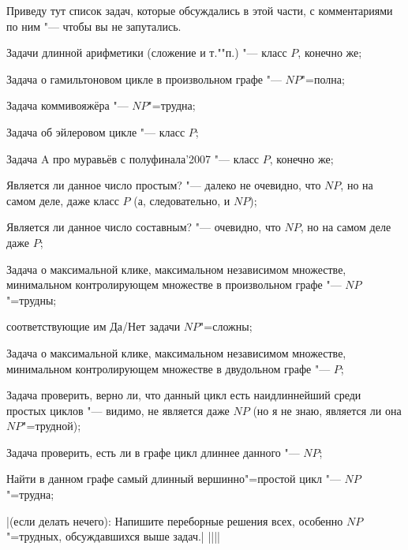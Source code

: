 \documentclass[a4paper,10pt]{problems}
\begin{document}
 Приведу тут список задач, которые обсуждались в этой 
части, с комментариями по ним "--- чтобы вы не запутались.
\begin{ulist}
\item Задачи длинной арифметики (сложение и т.""п.) "--- класс $P$, конечно же;
\item Задача о гамильтоновом цикле в произвольном графе "--- $NP$"=полна;
\item Задача коммивояжёра "--- $NP$"=трудна;
\item Задача об эйлеровом цикле "--- класс $P$;
\item Задача A про муравьёв с полуфинала'2007 "--- класс $P$, конечно же;
\item Является ли данное число простым? "--- далеко не очевидно, что $NP$, но 
на самом деле, даже класс $P$ (а, следовательно, и $NP$);
\item Является ли данное число составным? "--- очевидно, что $NP$, но 
на самом деле даже $P$;
\item Задача о максимальной клике, максимальном независимом множестве, 
минимальном контролирующем множестве в произвольном графе "--- $NP$"=трудны;

соответствующие им Да/Нет задачи $NP$"=сложны;
\item Задача о максимальной клике, максимальном независимом множестве, 
минимальном контролирующем множестве в двудольном графе "--- $P$;
\item Задача проверить, верно ли, что данный цикл есть наидлиннейший среди 
простых циклов "--- видимо, не является даже $NP$ (но я не знаю, является ли она $NP$"=трудной);
\item Задача проверить, есть ли в графе цикл длиннее данного "--- $NP$;
\item Найти в данном графе самый длинный вершинно"=простой цикл "--- $NP$"=трудна;
\end{ulist}

|(если делать нечего): Напишите переборные решения всех, особенно $NP$"=трудных, обсуждавшихся выше задач.|
||||

\immediate\closeout\tsk
\immediate\closeout\hnt
\immediate\closeout\ans
\eject{}

\eject{}

\end{document}
